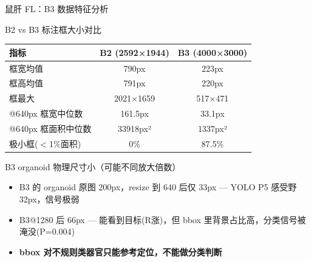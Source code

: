 \documentclass[aspectratio=169, 10pt]{beamer}
\begin{document}
\begin{frame}{鼠肝 FL：B3 数据特征分析}
  \begin{block}{B2 vs B3 标注框大小对比}
    \begin{tabular}{lcc}
      \toprule
      \textbf{指标} & \textbf{B2 (2592×1944)} & \textbf{B3 (4000×3000)} \\
      \midrule
      框宽均值 & 790px & \alert{223px} \\
      框高均值 & 791px & \alert{220px} \\
      框最大 & 2021×1659 & 517×471 \\
      @640px 框宽中位数 & 161.5px & \alert{33.1px} \\
      @640px 框面积中位数 & 33918px² & \alert{1337px²} \\
      极小框($<$1\%面积) & 0\% & \alert{87.5\%} \\
      \bottomrule
    \end{tabular}
  \end{block}
  \vspace{0em}
  \begin{alertblock}{B3 organoid 物理尺寸小（可能不同放大倍数）}
    \begin{itemize}
      \item B3 的 organoid 原图 200px，resize 到 640 后仅 33px — YOLO P5 感受野 32px，信号极弱
      \item B3@1280 后 66px — 能看到目标(R涨)，但 bbox 里背景占比高，分类信号被淹没(P=0.004)
      \item \textbf{bbox 对不规则类器官只能参考定位，不能做分类判断}
    \end{itemize}
  \end{alertblock}
\end{frame}
\end{document}
